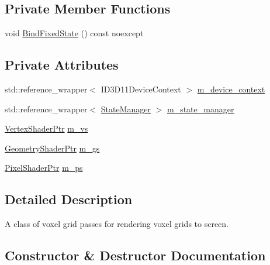 \subsection*{Private Member Functions}
\begin{DoxyCompactItemize}
\item 
void \hyperlink{classmage_1_1rendering_1_1_voxel_grid_pass_a38a3d6338eded537aab2ced5c486bdd4}{Bind\+Fixed\+State} () const noexcept
\end{DoxyCompactItemize}
\subsection*{Private Attributes}
\begin{DoxyCompactItemize}
\item 
std\+::reference\+\_\+wrapper$<$ I\+D3\+D11\+Device\+Context $>$ \hyperlink{classmage_1_1rendering_1_1_voxel_grid_pass_aaf8d84bbd6efe405a649b3ab643abefc}{m\+\_\+device\+\_\+context}
\item 
std\+::reference\+\_\+wrapper$<$ \hyperlink{classmage_1_1rendering_1_1_state_manager}{State\+Manager} $>$ \hyperlink{classmage_1_1rendering_1_1_voxel_grid_pass_ab1072fa557827f7e71f2094ce25f733e}{m\+\_\+state\+\_\+manager}
\item 
\hyperlink{namespacemage_1_1rendering_aaf704b9c54a4181f4950a1761de69dda}{Vertex\+Shader\+Ptr} \hyperlink{classmage_1_1rendering_1_1_voxel_grid_pass_a56d7195f315485c26ae690b1512a3c5e}{m\+\_\+vs}
\item 
\hyperlink{namespacemage_1_1rendering_aa5d63f80f9483d0896718813768ba1cf}{Geometry\+Shader\+Ptr} \hyperlink{classmage_1_1rendering_1_1_voxel_grid_pass_af94a1287d866d10b3dabb01a0f898eef}{m\+\_\+gs}
\item 
\hyperlink{namespacemage_1_1rendering_af03d922b228ee9c8542baaa2ecc9f259}{Pixel\+Shader\+Ptr} \hyperlink{classmage_1_1rendering_1_1_voxel_grid_pass_a19cb04ed26d43e59277ffef4039a051d}{m\+\_\+ps}
\end{DoxyCompactItemize}


\subsection{Detailed Description}
A class of voxel grid passes for rendering voxel grids to screen. 

\subsection{Constructor \& Destructor Documentation}
\hypertarget{classmage_1_1rendering_1_1_voxel_grid_pass_ad748e2aaccd4d34bcf5216815fe6d56f}{}\label{classmage_1_1rendering_1_1_voxel_grid_pass_ad748e2aaccd4d34bcf5216815fe6d56f} 
